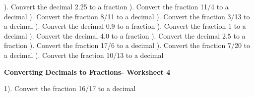 \documentclass{article}%
\begin{document}
\newline%
). Convert the decimal 2.25 to a fraction%
\newline%
\newline%
). Convert the fraction 11/4 to a decimal%
\newline%
\newline%
). Convert the fraction 8/11 to a decimal%
\newline%
\newline%
). Convert the fraction 3/13 to a decimal%
\newline%
\newline%
). Convert the decimal 0.9 to a fraction%
\newline%
\newline%
). Convert the fraction 1 to a decimal%
\newline%
\newline%
). Convert the decimal 4.0 to a fraction%
\newline%
\newline%
). Convert the decimal 2.5 to a fraction%
\newline%
\newline%
). Convert the fraction 17/6 to a decimal%
\newline%
\newline%
). Convert the fraction 7/20 to a decimal%
\newline%
\newline%
). Convert the fraction 10/13 to a decimal%
\newline%
\newline%
\newline%
\pagebreak%
\large%
\begin{center}%
\textbf{Converting Decimals to Fractions- Worksheet 4}%
\newline%
\end{center} \normalsize%
1). Convert the fraction 16/17 to a decimal%
\newline%
\newline%
\end{document}
